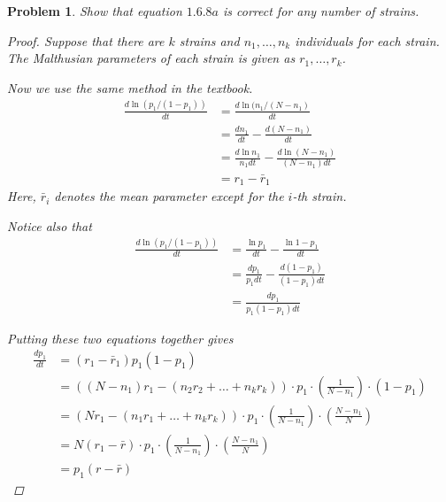 \documentclass[12pt]{report}
\newtheorem{problem}{Problem}[chapter]
\begin{document}
    \begin{problem}
        Show that equation $1.6.8a$ is correct for any number of strains.
        \begin{proof}
            Suppose that there are $k$ strains and $n_1, \ldots, n_k$ individuals for each strain. The Malthusian parameters of each strain is given as $r_1, \ldots, r_k$.

            Now we use the same method in the textbook.
            \begin{equation*}
                \begin{split}
                    \frac{d \ln(p_1/(1-p_1))}{dt}
                    &= \frac{d \ln(n_1/(N-n_1)}{dt}  \\
                    &= \frac{d n_1}{dt} - \frac{d (N-n_1)}{dt} \\
                    &= \frac{d \ln{n_1}}{n_1 dt} - \frac{d \ln(N-n_1)}{(N-n_1) dt} \\
                    &= r_1 - \bar{r}_1
                \end{split}
            \end{equation*}
            Here, $\bar{r}_i$ denotes the mean parameter except for the $i$-th strain. 

            Notice also that
            \begin{equation*}
                \begin{split}
                    \frac{d \ln(p_1/(1-p_1))}{dt}
                    &= \frac{\ln{p_1}}{dt} - \frac{\ln{1-p_1}}{dt} \\
                    &= \frac{d p_1}{p_1 dt} - \frac{d (1-p_1)}{(1-p_1)dt} \\
                    & = \frac{dp_1}{p_1(1-p_1)dt}
                \end{split}
            \end{equation*}

            Putting these two equations together gives
            \begin{equation*}
                \begin{split}
                    \frac{dp_1}{dt} 
                    &= (r_1-\bar{r}_1)p_1(1-p_1) \\
                    &= ((N-n_1)r_1 - (n_2r_2 + \ldots + n_kr_k)) \cdot p_1 \cdot
                    \left(\frac{1}{N-n_1}\right) \cdot (1-p_1) \\
                    &= (Nr_1 - (n_1r_1 + \ldots + n_kr_k)) \cdot p_1 \cdot
                    \left(\frac{1}{N-n_1}\right) \cdot 
                    \left(\frac{N-n_1}{N}\right) \\
                    &= N(r_1 - \bar{r}) \cdot p_1 \cdot
                    \left(\frac{1}{N-n_1}\right) \cdot 
                    \left(\frac{N-n_1}{N}\right) \\
                    &= p_1(r-\bar{r})
                \end{split}
            \end{equation*}
        \end{proof}


    \end{problem}
\end{document}
